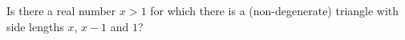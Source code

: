 Is there a real number $x>1$ for which there is a (non-degenerate) triangle with side lengths $x$, $x-1$ and $1$?
